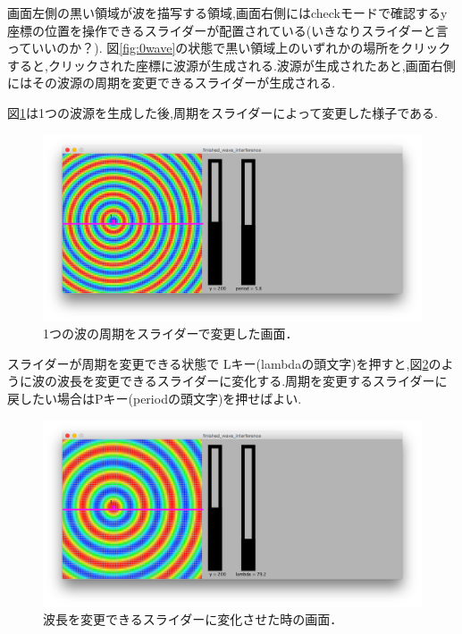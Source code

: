 画面左側の黒い領域が波を描写する領域,画面右側にはcheckモードで確認するy座標の位置を操作できるスライダーが配置されている(いきなりスライダーと言っていいのか？). 
図\ref{fig:0wave}の状態で黒い領域上のいずれかの場所をクリックすると,クリックされた座標に波源が生成される.波源が生成されたあと,画面右側にはその波源の周期を変更できるスライダーが生成される.

図\ref{fig:wave}は1つの波源を生成した後,周期をスライダーによって変更した様子である.
\begin{figure}[htbp]
 \begin{center}
  \includegraphics[width=\linewidth]{../result/wave.png}
 \end{center}
 \caption{1つの波の周期をスライダーで変更した画面．}
 \label{fig:wave}
\end{figure}

\newpage
スライダーが周期を変更できる状態で
Lキー(lambdaの頭文字)を押すと,図\ref{fig:wavechangelambda}のように波の波長を変更できるスライダーに変化する.周期を変更するスライダーに戻したい場合はPキー(periodの頭文字)を押せばよい.

\begin{figure}[htbp]
 \begin{center}
  \includegraphics[width=\linewidth]{../result/wavechangelambda.png}
 \end{center}
 \caption{波長を変更できるスライダーに変化させた時の画面．}
 \label{fig:wavechangelambda}
\end{figure}

